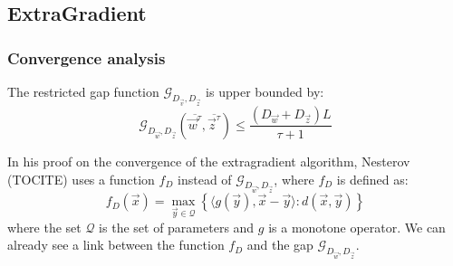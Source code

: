\subsection*{ExtraGradient}
\subsubsection*{Convergence analysis}
The restricted gap function
$\mathcal{G}_{D_{\vec v}, D_{\vec z}}$ is upper bounded by:
\begin{equation}
  \mathcal{G}_{D_{\vec w}, D_{\vec z}}(\overline{\vec w^{\tau}},
\overline{\vec z^{\tau}}) \leq \frac{\left( D_{\vec w} + D_{\vec z} \right)
L}{\tau + 1}
\label{eq:ub}
\end{equation}

In his proof on the convergence of the extragradient algorithm, Nesterov
(TOCITE) uses a function $f_D$ instead of $\mathcal{G}_{D_{\vec w}, D_{\vec
z}}$, where $f_D$ is defined as:
\begin{equation}
f_D(\vec x) = \max_{\vec y \in \mathcal{Q}} \left \{ \langle g(\vec y), \vec x -
\vec y \rangle : d(\vec x, \vec y) \right \}
\end{equation}
where the set $\mathcal{Q}$ is the set of parameters and $g$ is a monotone
operator. We can already see a link between the function $f_D$ and the gap
$\mathcal{G}_{D_{\vec w}, D_{\vec z}}$.


